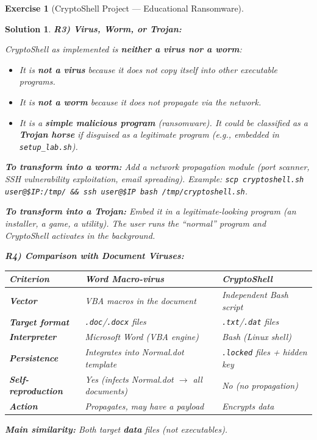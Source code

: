 \documentclass[a4paper,11pt]{article}
\theoremstyle{plain}
\newtheorem{correction}{Solution}
\theoremstyle{definition}
\newtheorem{exercice}{Exercise}
\begin{document}
\begin{exercice}[CryptoShell Project --- Educational Ransomware]
\begin{correction}
\medskip
\textbf{R3) Virus, Worm, or Trojan:}

CryptoShell as implemented is \textbf{neither a virus nor a worm}:
\begin{itemize}
    \item It is \textbf{not a virus} because it does not copy itself into other executable programs.
    \item It is \textbf{not a worm} because it does not propagate via the network.
    \item It is a \textbf{simple malicious program} (ransomware). It could be classified as a \textbf{Trojan horse} if disguised as a legitimate program (e.g., embedded in \texttt{setup\_lab.sh}).
\end{itemize}

\textbf{To transform into a worm:} Add a network propagation module (port scanner, SSH vulnerability exploitation, email spreading). Example: \texttt{scp cryptoshell.sh user@\$IP:/tmp/ \&\& ssh user@\$IP bash /tmp/cryptoshell.sh}.

\textbf{To transform into a Trojan:} Embed it in a legitimate-looking program (an installer, a game, a utility). The user runs the ``normal'' program and CryptoShell activates in the background.

\medskip
\textbf{R4) Comparison with Document Viruses:}

\begin{center}
\begin{tabular}{lp{4.5cm}p{4.5cm}}
\toprule
\textbf{Criterion} & \textbf{Word Macro-virus} & \textbf{CryptoShell} \\
\midrule
\textbf{Vector} & VBA macros in the document & Independent Bash script \\
\textbf{Target format} & \texttt{.doc}/\texttt{.docx} files & \texttt{.txt}/\texttt{.dat} files \\
\textbf{Interpreter} & Microsoft Word (VBA engine) & Bash (Linux shell) \\
\textbf{Persistence} & Integrates into Normal.dot template & \texttt{.locked} files + hidden key \\
\textbf{Self-reproduction} & Yes (infects Normal.dot $\to$ all documents) & No (no propagation) \\
\textbf{Action} & Propagates, may have a payload & Encrypts data \\
\bottomrule
\end{tabular}
\end{center}

\textbf{Main similarity:} Both target \textbf{data} files (not executables).


\end{correction}
\end{exercice}
\end{document}
